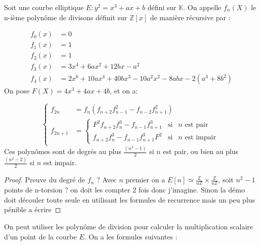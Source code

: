 \documentclass{article}
\begin{document}
\begin{defi}
Soit une courbe elliptique $E : y^2 = x^3 + ax+b$ défini sur $\mathbb{K}$. On appelle $f_n(X)$ le n-ième polynôme de divisons définit sur $\mathbb{Z}[x]$ de manière récursive par : 


\begin{align*}
f_0(x) &= 0 \\
f_1(x) &= 1 \\
f_2(x) &= 1 \\
f_3(x) &= 3x^4 + 6ax^2 +12bx - a^2 \\
f_4(x) &= 2x^6 + 10ax^4 +40bx^3 - 10a^2x^2 - 8abx - 2(a^3 + 8b^2)
\end{align*}
On pose $F(X)= 4x^3 + 4ax + 4b$, et on a:

\begin{equation}
\left\lbrace
\begin{array}{ll}
f_{2n}& =  f_n(f_{n+2}f_{n-1}^2 - f_{n-2}f_{n+1}^2)   \\
f_{2n+1}& = \left\lbrace 
\begin{array}{ccc}
F^2f_{n+2}f_n^3 - f_{n-1}f_{n+1}^3 & \mbox{si} & n \text{ est pair}\\
f_{n+2}f_n^3 - f_{n-1}f_{n+1}^3F^2 & \mbox{si} & n \text{ est impair} \end{array}\right.

\end{array} \right.
\end{equation} 
Ces polynômes sont de degrés au plus $\frac{(n^2 -1)}{2}$ si $n$ est pair, ou bien  au plus $\frac{(n^2 -2)}{2}$ si $n$ est impair.
\end{defi}

\begin{proof}
Preuve du degré de $f_n$ ? 
Avec $n$ premier on a $E[n] \simeq \frac{\mathbb{Z}}{n\mathbb{Z}} \times \frac{\mathbb{Z}}{n\mathbb{Z}}$, soit $n^2 - 1$ points de n-torsion ? on doit les compter 2 fois donc j'imagine. Sinon la démo doit découler toute seule en utilisant les formules de recurrence mais un peu plus pénible a écrire
\end{proof}

On peut utiliser les polynôme de division pour calculer la multiplication scalaire d'un point de la courbe $E$.
On a les formules suivantes : 
\end{document}
